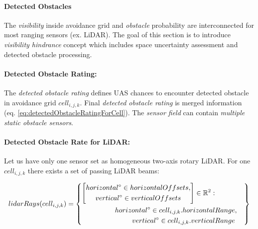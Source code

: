 \paragraph{Detected Obstacles} The \emph{visibility} inside avoidance grid and \emph{obstacle} probability are interconnected for most ranging sensors (ex. LiDAR). The goal of this section is to introduce \emph{visibility hindrance} concept which includes space uncertainty assessment and detected obstacle  processing.

\paragraph{Detected Obstacle Rating:} The \emph{detected obstacle rating} defines UAS chances to encounter detected obstacle in avoidance grid $cell_{i,j,k}$. Final \emph{detected obstacle rating} is merged information (eq. \ref{eq:detectedObstacleRatingForCell}). The \emph{sensor field} can contain \emph{multiple} \emph{static obstacle sensors}.

\newpage
\paragraph{Detected Obstacle Rate for LiDAR:} Let us have only one sensor set as homogeneous two-axis rotary LiDAR. For one $cell_{i,j,k}$ there exists a set of passing LiDAR beams:

\begin{equation}\label{eq:lidarRaysTroughCell}
    lidar Rays(cell_{i,j,k})=
    \left\{
        \begin{aligned}
        \left[
            \begin{gathered}
                horizontal^\circ\in horizontal Offsets,\\
                vertical^\circ\in vertical Offsets
            \end{gathered}
        \right]\in\mathbb{R}^2:&\\
        horizontal^\circ\in cell_{i,j,k}.horizontal &Range,\\
        vertical^\circ\in cell_{i,j,k}.vertical &Range\\
        \end{aligned}
    \right\}
\end{equation}

